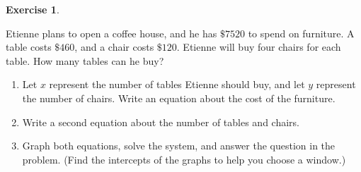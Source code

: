 \documentclass[10pt,]{book}
\theoremstyle{plain}
\theoremstyle{definition}
\theoremstyle{definition}
\theoremstyle{definition}
\theoremstyle{definition}
\newtheorem{exercise}[theorem]{Exercise}
\numberwithin{equation}{section}
\begin{document}
\begin{exercise}\label{exercise-7}

		Etienne plans to open a coffee house, and he has \(\$7520\) to spend on furniture. A table costs \(\$460\), and a chair costs \(\$120\). Etienne will buy four chairs for each table. How many tables can he buy?
		\leavevmode%
\begin{enumerate}[label=*\alph**]
\item\hypertarget{li-40}{}
				Let \(x\) represent the number of tables Etienne should buy, and let \(y\) represent the number of chairs. Write an equation about the cost of the furniture.
\item\hypertarget{li-41}{}
				Write a second equation about the number of tables and chairs.
\item\hypertarget{li-42}{}
				Graph both equations, solve the system, and answer the question in the problem. (Find the intercepts of the graphs to help you choose a window.)
\end{enumerate}

\end{exercise}
\par
\end{document}
